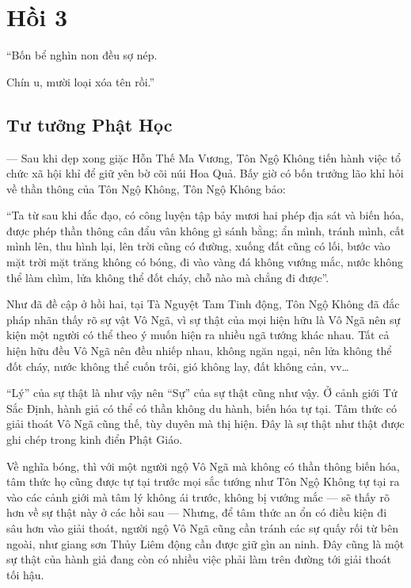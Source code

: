 \chapter{Hồi 3} %
\label{cha:hoi_3}

\begin{itshape}
``Bốn bể nghìn non đều sợ nép.

Chín u, mười loại xóa tên rồi.''
\end{itshape}

\section{Tư tưởng Phật Học} %
\label{sec:3_phat_hoc}

--- Sau khi dẹp xong giặc Hỗn Thế Ma Vương, Tôn Ngộ Không tiến hành việc tổ chức xã hội khỉ để giữ yên bờ cõi núi Hoa Quả. Bấy giờ có bốn trưởng lão khỉ hỏi về thần thông của Tôn Ngộ Không, Tôn Ngộ Không bảo:

\begin{itshape}
``Ta từ sau khi đắc đạo, có công luyện tập bảy mươi hai phép địa sát và biến hóa, được phép thần thông cân đẩu vân không gì sánh bằng; ẩn mình, tránh mình, cất mình lên, thu hình lại, lên trời cũng có đường, xuống đất cũng có lối, bước vào mặt trời mặt trăng không có bóng, đi vào vàng đá không vướng mắc, nước không thể làm chìm, lửa không thể đốt cháy, chỗ nào mà chẳng đi được''.
\end{itshape}

Như đã đề cập ở hồi hai, tại Tà Nguyệt Tam Tinh động, Tôn Ngộ Không đã đắc pháp nhãn thấy rõ sự vật Vô Ngã, vì sự thật của mọi hiện hữu là Vô Ngã nên sự kiện một người có thể theo ý muốn hiện ra nhiều ngã tướng khác nhau. Tất cả hiện hữu đều Vô Ngã nên đều nhiếp nhau, không ngăn ngại, nên lửa không thể đốt cháy, nước không thể cuốn trôi, gió không lay, đất không cản, vv\ldots

``Lý'' của sự thật là như vậy nên ``Sự'' của sự thật cũng như vậy. Ở cảnh giới Tứ Sắc Định, hành giả có thể có thần không du hành, biến hóa tự tại. Tâm thức có giải thoát Vô Ngã cũng thế, tùy duyên mà thị hiện. Đây là sự thật như thật được ghi chép trong kinh điển Phật Giáo.

Về nghĩa bóng, thì với một người ngộ Vô Ngã mà không có thần thông biến hóa, tâm thức họ cũng được tự tại trước mọi sắc tướng như Tôn Ngộ Không tự tại ra vào các cảnh giới mà tâm lý không ái trước, không bị vướng mắc --- sẽ thấy rõ hơn về sự thật này ở các hồi sau --- Nhưng, để tâm thức an ổn có điều kiện đi sâu hơn vào giải thoát, người ngộ Vô Ngã cũng cần tránh các sự quấy rối từ bên ngoài, như giang sơn Thủy Liêm động cần được giữ gìn an ninh. Đây cũng là một sự thật của hành giả đang còn có nhiều việc phải làm trên đường tới giải thoát tối hậu.

